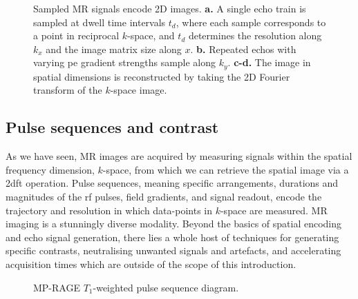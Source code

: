 \begin{figure}
  
  \caption{Sampled MR signals encode 2D images. \textbf{a.} A single echo train is sampled at dwell time intervals $t_d$, where each sample corresponds to a point in reciprocal $k$-space, and $t_d$ determines the resolution along $k_x$ and the image matrix size along $x$. \textbf{b.} Repeated echos with varying \gls{pe} gradient strengths sample along $k_y$. \textbf{c-d.} The image in spatial dimensions is reconstructed by taking the 2D Fourier transform of the $k$-space image. }
  \label{fig:kspace}
\end{figure}

\subsection{Pulse sequences and contrast}

As we have seen, MR images are acquired by measuring signals within the spatial frequency dimension, $k$-space, from which we can retrieve the spatial image via a \gls{2dft} operation.
Pulse sequences, meaning specific arrangements, durations and magnitudes of the \gls{rf} pulses, field gradients, and signal readout, encode the trajectory and resolution in which data-points in $k$-space are measured.
MR imaging is a stunningly diverse modality.
Beyond the basics of spatial encoding and echo signal generation, there lies a whole host of techniques for generating specific contrasts, neutralising unwanted signals and artefacts, and accelerating acquisition times which are outside of the scope of this introduction.

\begin{figure}[htb!]
  
  \caption{MP-RAGE $T_1$-weighted pulse sequence diagram. }
  \label{fig:mprage}
\end{figure}


